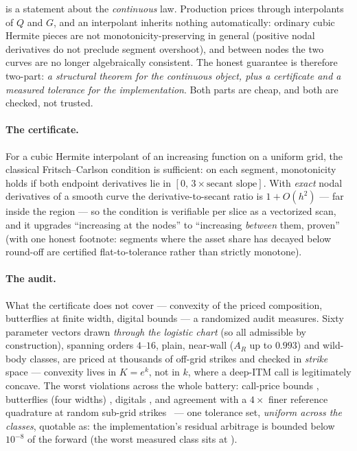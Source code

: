 \documentclass[11pt]{article}
\begin{document}
 is a statement about the \emph{continuous} law.
Production prices through interpolants of $Q$ and $G$, and an interpolant
inherits nothing automatically: ordinary cubic Hermite pieces are not
monotonicity-preserving in general (positive nodal derivatives do not
preclude segment overshoot), and between nodes the two curves are no longer
algebraically consistent.  The honest guarantee is therefore two-part:
\emph{a structural theorem for the continuous object, plus a certificate and
a measured tolerance for the implementation}.  Both parts are cheap, and
both are checked, not trusted.

\paragraph{The certificate.}  For a cubic Hermite interpolant of an
increasing function on a uniform grid, the classical Fritsch--Carlson
condition is sufficient: on each segment, monotonicity holds if both
endpoint derivatives lie in $[0,\,3\times\text{secant slope}]$.  With
\emph{exact} nodal derivatives of a smooth curve the derivative-to-secant
ratio is $1+O(h^{2})$ --- far inside the region --- so the condition is
verifiable per slice as a vectorized scan, and it upgrades ``increasing at
the nodes'' to ``increasing \emph{between} them, proven'' (with one honest
footnote: segments where the asset share has decayed below round-off are
certified flat-to-tolerance rather than strictly monotone).

\paragraph{The audit.}  What the certificate does not cover --- convexity of
the priced composition, butterflies at finite width, digital bounds ---
a randomized audit measures.  Sixty parameter vectors drawn \emph{through
the logistic chart} (so all admissible by construction), spanning orders
$4$--$16$, plain, near-wall ($A_R$ up to $0.993$) and wild-body classes, are
priced at thousands of off-grid strikes and checked in \emph{strike} space
--- convexity lives in $K=e^{k}$, not in $k$, where a deep-ITM call is
legitimately concave.  The worst violations across the whole battery:
call-price bounds \lqdrefcertbounds, butterflies (four widths)
\lqdrefcertfly, digitals \lqdrefcertdig, and agreement with a $4\times$
finer reference quadrature at random sub-grid strikes \lqdrefcertfine\ ---
one tolerance set, \emph{uniform across the classes}, quotable as: the
implementation's residual arbitrage is bounded below $10^{-8}$ of the
forward (the worst measured class sits at \lqdrefcertfine).
\end{document}
